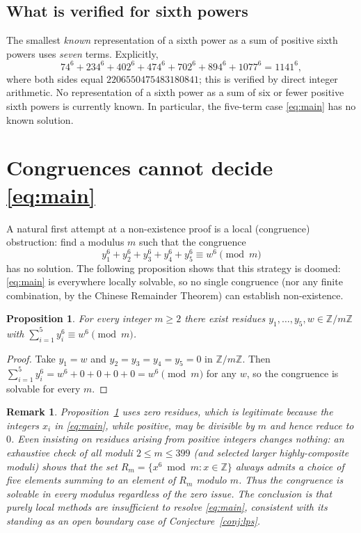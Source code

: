 \documentclass{amsart}
\newtheorem{proposition}{Proposition}
\newtheorem{remark}{Remark}
\begin{document}
\subsection*{What is verified for sixth powers}
The smallest \emph{known} representation of a sixth power as a sum of
positive sixth powers uses \emph{seven} terms. Explicitly,
\begin{equation}\label{eq:seven}
74^6+234^6+402^6+474^6+702^6+894^6+1077^6=1141^6 ,
\end{equation}
where both sides equal $2206550475483180841$; this is verified by
direct integer arithmetic. No representation of a sixth power as a sum
of six or fewer positive sixth powers is currently known. In
particular, the five-term case \eqref{eq:main} has no known solution.

\section*{Congruences cannot decide \eqref{eq:main}}

A natural first attempt at a non-existence proof is a local
(congruence) obstruction: find a modulus $m$ such that the congruence
$$
y_1^6+y_2^6+y_3^6+y_4^6+y_5^6\equiv w^6 \pmod m
$$
has no solution. The following proposition shows that this strategy is
doomed: \eqref{eq:main} is everywhere locally solvable, so no single
congruence (nor any finite combination, by the Chinese Remainder
Theorem) can establish non-existence.

\begin{proposition}\label{prop:local}
For every integer $m\ge 2$ there exist residues
$y_1,\dots,y_5,w\in\mathbb{Z}/m\mathbb{Z}$ with
$\sum_{i=1}^5 y_i^6\equiv w^6\pmod m$.
\end{proposition}

\begin{proof}
Take $y_1=w$ and $y_2=y_3=y_4=y_5=0$ in $\mathbb{Z}/m\mathbb{Z}$. Then
$\sum_{i=1}^5 y_i^6=w^6+0+0+0+0=w^6\pmod m$ for any $w$, so the
congruence is solvable for every $m$.
\end{proof}

\begin{remark}\label{rem:posresidues}
Proposition~\ref{prop:local} uses zero residues, which is legitimate
because the integers $x_i$ in \eqref{eq:main}, while positive, may be
divisible by $m$ and hence reduce to $0$. Even insisting on residues
arising from positive integers changes nothing: an exhaustive check of
all moduli $2\le m\le 399$ (and selected larger highly-composite
moduli) shows that the set $R_m=\{x^6\bmod m: x\in\mathbb{Z}\}$ always
admits a choice of five elements summing to an element of $R_m$ modulo
$m$. Thus the congruence is solvable in every modulus regardless of the
zero issue. The conclusion is that purely local methods are
insufficient to resolve \eqref{eq:main}, consistent with its standing
as an open boundary case of Conjecture~\ref{conj:lps}.
\end{remark}
\end{document}
